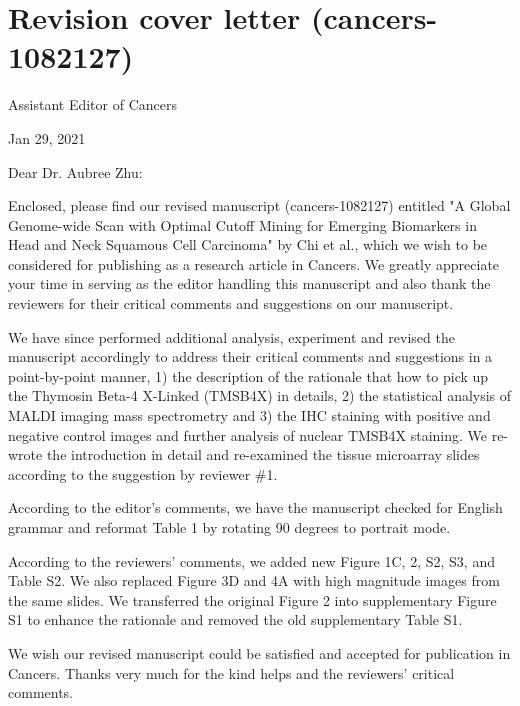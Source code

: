 \documentclass[preprint,12pt]{elsarticle}
\begin{document}
\section{Revision cover letter (cancers-1082127)} %
 

Assistant Editor of Cancers%

Jan 29, 2021

Dear Dr. Aubree Zhu:

Enclosed, please find our revised manuscript (cancers-1082127) entitled "A Global Genome-wide Scan with Optimal Cutoff Mining for Emerging Biomarkers in Head and Neck Squamous Cell Carcinoma" by Chi et al., which we wish to be considered for publishing as a research article in Cancers. We greatly appreciate your time in serving as the editor handling this manuscript and also thank the reviewers for their critical comments and suggestions on our manuscript.

We have since performed additional analysis, experiment and revised the manuscript accordingly to address their critical comments and suggestions in a point-by-point manner, 
1) the description of the rationale that how to pick up the Thymosin Beta-4 X-Linked (TMSB4X) in details, 2) the statistical analysis of MALDI imaging mass spectrometry and 3) the IHC staining with positive and negative control images and further analysis of nuclear TMSB4X staining. 
We re-wrote the introduction in detail and re-examined the tissue microarray slides according to the suggestion by reviewer \#1.

According to the editor's comments, we have the manuscript checked for English grammar and reformat Table 1 by rotating 90 degrees to portrait mode. %

According to the reviewers' comments, we added new Figure 1C, 2, S2, S3, and Table S2. We also replaced Figure 3D and 4A with high magnitude images from the same slides. We transferred the original Figure 2 into supplementary Figure S1 to enhance the rationale and removed the old supplementary Table S1.

We wish our revised manuscript could be satisfied and accepted for publication in Cancers. Thanks very much for the kind helps and the reviewers' critical comments.
\end{document}
